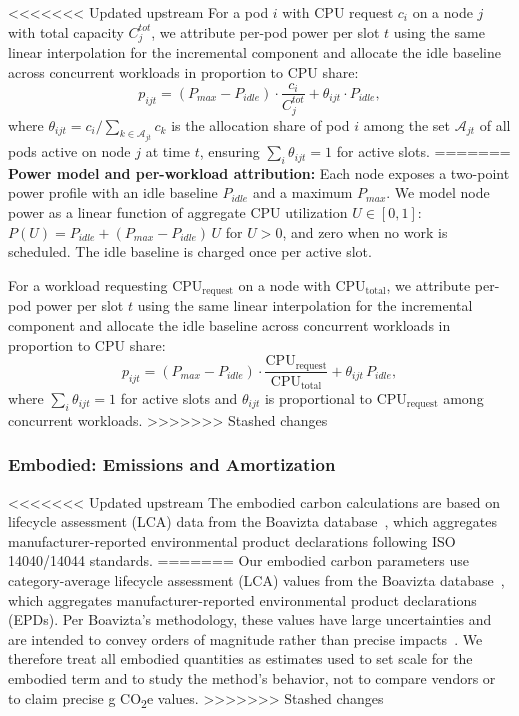 \documentclass[10pt,journal,compsoc]{IEEEtran}
\begin{document}
<<<<<<< Updated upstream
For a pod \(i\) with CPU request \(c_i\) on a node \(j\) with total capacity \(C_j^{tot}\), we attribute per-pod power per slot \(t\) using the same linear interpolation for the incremental component and allocate the idle baseline across concurrent workloads in proportion to CPU share:
\begin{equation}
p_{ijt} = (P_{max} - P_{idle}) \cdot \frac{c_i}{C_j^{tot}} + \theta_{ijt} \cdot P_{idle},
\end{equation}
where \(\theta_{ijt} = c_i / \sum_{k \in \mathcal{A}_{jt}} c_k\) is the allocation share of pod \(i\) among the set \(\mathcal{A}_{jt}\) of all pods active on node \(j\) at time \(t\), ensuring \(\sum_i \theta_{ijt} = 1\) for active slots.
=======
\textbf{Power model and per-workload attribution:} Each node exposes a two-point power profile with an idle baseline \(P_{idle}\) and a maximum \(P_{max}\). We model node power as a linear function of aggregate CPU utilization \(U \in [0,1]\):
\(P(U) = P_{idle} + (P_{max} - P_{idle})\,U\) for \(U>0\), and zero when no work is scheduled. The idle baseline is charged once per active slot.

For a workload requesting \(\mathrm{CPU}_{\mathrm{request}}\) on a node with \(\mathrm{CPU}_{\mathrm{total}}\), we attribute per-pod power per slot \(t\) using the same linear interpolation for the incremental component and allocate the idle baseline across concurrent workloads in proportion to CPU share:
\begin{equation*}
p_{ijt} = (P_{max} - P_{idle}) \cdot \frac{\mathrm{CPU}_{\mathrm{request}}}{\mathrm{CPU}_{\mathrm{total}}} + \theta_{ijt}\,P_{idle},
\end{equation*}
where \(\sum_i \theta_{ijt} = 1\) for active slots and \(\theta_{ijt}\) is proportional to \(\mathrm{CPU}_{\mathrm{request}}\) among concurrent workloads.
>>>>>>> Stashed changes


\subsubsection{Embodied: Emissions and Amortization}\label{s:emb}


<<<<<<< Updated upstream
The embodied carbon calculations are based on lifecycle assessment (LCA) data from the Boavizta database~\cite{boavizta2023}, which aggregates manufacturer-reported environmental product declarations following ISO 14040/14044 standards.
=======
Our embodied carbon parameters use category-average lifecycle assessment (LCA) values from the Boavizta database~\cite{boavizta2023}, which aggregates manufacturer-reported environmental product declarations (EPDs). Per Boavizta's methodology, these values have large uncertainties and are intended to convey orders of magnitude rather than precise impacts~\cite{boavizta2023methodology}. We therefore treat all embodied quantities as estimates used to set scale for the embodied term and to study the method’s behavior, not to compare vendors or to claim precise g CO\textsubscript{2}e values.
>>>>>>> Stashed changes
\end{document}
